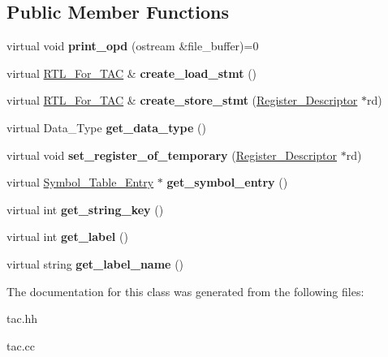 \subsection*{Public Member Functions}
\begin{DoxyCompactItemize}
\item 
\mbox{\label{classTAC__Opd_a6eed2593188169707e7fc39b32fd7516}} 
virtual void {\bfseries print\+\_\+opd} (ostream \&file\+\_\+buffer)=0
\item 
\mbox{\label{classTAC__Opd_a92ddd17fdba94a1ac9b94b4a9c04d98a}} 
virtual \hyperlink{classRTL__For__TAC}{R\+T\+L\+\_\+\+For\+\_\+\+T\+AC} \& {\bfseries create\+\_\+load\+\_\+stmt} ()
\item 
\mbox{\label{classTAC__Opd_a5b8dd3e1b1d547deae7e9003d6944c91}} 
virtual \hyperlink{classRTL__For__TAC}{R\+T\+L\+\_\+\+For\+\_\+\+T\+AC} \& {\bfseries create\+\_\+store\+\_\+stmt} (\hyperlink{classRegister__Descriptor}{Register\+\_\+\+Descriptor} $\ast$rd)
\item 
\mbox{\label{classTAC__Opd_a64a80008ea7c3457ddd84dac45cf7a44}} 
virtual Data\+\_\+\+Type {\bfseries get\+\_\+data\+\_\+type} ()
\item 
\mbox{\label{classTAC__Opd_af0f8a9f7f08f3df037e176e305610fc5}} 
virtual void {\bfseries set\+\_\+register\+\_\+of\+\_\+temporary} (\hyperlink{classRegister__Descriptor}{Register\+\_\+\+Descriptor} $\ast$rd)
\item 
\mbox{\label{classTAC__Opd_ac5298270ab9f299b6759f380577530fb}} 
virtual \hyperlink{classSymbol__Table__Entry}{Symbol\+\_\+\+Table\+\_\+\+Entry} $\ast$ {\bfseries get\+\_\+symbol\+\_\+entry} ()
\item 
\mbox{\label{classTAC__Opd_ae3da5a5146c1915315ff93042896fc74}} 
virtual int {\bfseries get\+\_\+string\+\_\+key} ()
\item 
\mbox{\label{classTAC__Opd_a47173a829de7f5a84766880568f63217}} 
virtual int {\bfseries get\+\_\+label} ()
\item 
\mbox{\label{classTAC__Opd_aa2024f9a21710b0e8b573c122c9fd3f4}} 
virtual string {\bfseries get\+\_\+label\+\_\+name} ()
\end{DoxyCompactItemize}


The documentation for this class was generated from the following files\+:\begin{DoxyCompactItemize}
\item 
tac.\+hh\item 
tac.\+cc\end{DoxyCompactItemize}
